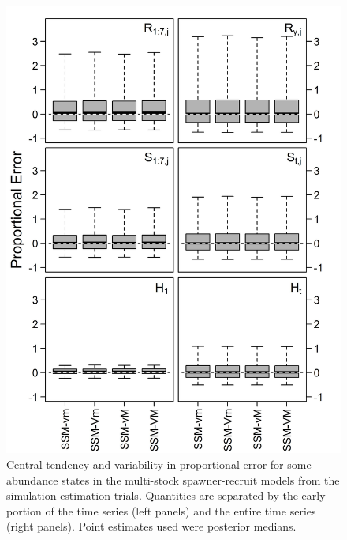 \documentclass[12pt,]{book}
\theoremstyle{definition}
\theoremstyle{definition}
\theoremstyle{definition}
\theoremstyle{remark}
\begin{document}
\begin{figure}
  \centering
  \includegraphics{img/Ch4/state-bias.jpg}
  \caption{Central tendency and variability in proportional error for some abundance states in the multi-stock spawner-recruit models from the simulation-estimation trials. Quantities are separated by the early portion of the time series (left panels) and the entire time series (right panels). Point estimates used were posterior medians.}
  \label{fig:state-bias}
\end{figure}

\clearpage
\end{document}
